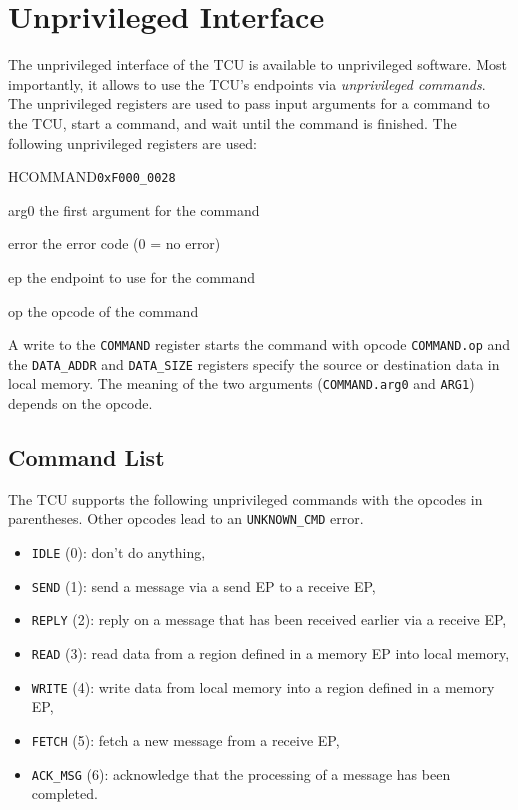 \chapter{Unprivileged Interface}

The unprivileged interface of the TCU is available to unprivileged software. Most importantly, it
allows to use the TCU's endpoints via \emph{unprivileged commands}. The unprivileged registers are
used to pass input arguments for a command to the TCU, start a command, and wait until the command
is finished. The following unprivileged registers are used:

\begin{register}{H}{COMMAND}{\texttt{0xF000\_0028}}
  \regnewline%
  \begin{regdesc}\begin{reglist}
    \item[arg0] the first argument for the command
    \item[error] the error code (0 = no error)
    \item[ep] the endpoint to use for the command
    \item[op] the opcode of the command
  \end{reglist}\end{regdesc}
\end{register}

\noindent A write to the \texttt{COMMAND} register starts the command with opcode
\texttt{COMMAND.op} and the \texttt{DATA\_ADDR} and \texttt{DATA\_SIZE} registers specify the source
or destination data in local memory. The meaning of the two arguments (\texttt{COMMAND.arg0} and
\texttt{ARG1}) depends on the opcode.

\section{Command List}

The TCU supports the following unprivileged commands with the opcodes in parentheses. Other opcodes
lead to an \texttt{UNKNOWN\_CMD} error.

\begin{itemize}
  \item \texttt{IDLE} (0): don't do anything,
  \item \texttt{SEND} (1): send a message via a send EP to a receive EP,
  \item \texttt{REPLY} (2): reply on a message that has been received earlier via a receive EP,
  \item \texttt{READ} (3): read data from a region defined in a memory EP into local memory,
  \item \texttt{WRITE} (4): write data from local memory into a region defined in a memory EP,
  \item \texttt{FETCH} (5): fetch a new message from a receive EP,
  \item \texttt{ACK\_MSG} (6): acknowledge that the processing of a message has been completed.
\end{itemize}

